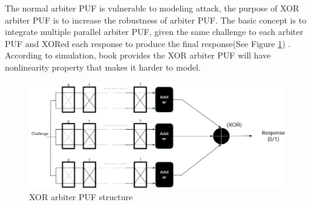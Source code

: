 The normal arbiter PUF is vulnerable to modeling attack, the purpose of XOR arbiter PUF is to increase the robustness of arbiter PUF. The basic concept is to integrate multiple parallel arbiter PUF, given the same challenge to each arbiter PUF and XORed each response to produce the final response(See Figure \ref{fig:figure7}) \cite{Reference5}.
According to simulation, book \cite{Reference4} provides the XOR arbiter PUF will have nonlinearity property that makes it harder to model.

\begin{figure}[htp]
    \centering
    \includegraphics[width=18cm]{figures/figure7.jpg}
    \caption{XOR arbiter PUF structure}
    \label{fig:figure7}
    \end{figure}


